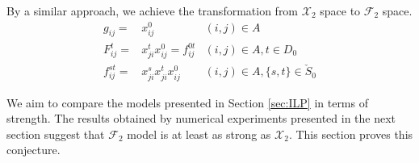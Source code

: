 By a similar approach, we achieve the transformation from $\mathcal{X}_2$ space to $\mathcal{F}_2$ space. 
\begin{subequations}
\begin{align}
\label{eq:tr:xij=xij0}g_{ij}=&x^0_{ij} & (i,j)\in A\\
\label{eq:tr:fijt2}F^t_{ij}=&x^t_{ji}x^0_{ij}=f^{0t}_{ij} & (i,j)\in A, t\in D_0\\
\label{eq:tr:fstij2} f^{st}_{ij}=& x^s_{ji}x^t_{ji}x^0_{ij} & (i,j)\in A, \{s,t\}\in \check{S}_0
\end{align}
\end{subequations}

We aim to compare the models presented in Section \ref{sec:ILP} in terms of strength.
The results obtained by numerical experiments presented in the next section suggest that $\mathcal{F}_2$ model is at least as strong as $\mathcal{X}_2$.
This section proves this conjecture.
 
